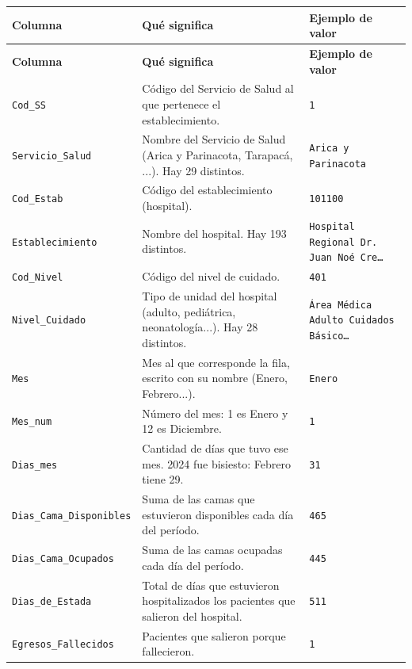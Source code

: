 \documentclass[10.5pt]{article}
\newcommand{\hdr}[1]{\textbf{\color{white}#1}}
\begin{document}
\begin{xltabular}{\linewidth}{@{}p{4.5cm} >{\raggedright\arraybackslash}X p{3.4cm}@{}}
\hdr{Columna} & \hdr{Qué significa} & \hdr{Ejemplo de valor} \\
\endfirsthead
{}\hdr{Columna} & \hdr{Qué significa} & \hdr{Ejemplo de valor} \\
\endhead
\texttt{Cod\_\allowbreak{}SS} & Código del Servicio de Salud al que pertenece el establecimiento. & \texttt{1} \\
\texttt{Servicio\_\allowbreak{}Salud} & Nombre del Servicio de Salud (Arica y Parinacota, Tarapacá, ...). Hay 29 distintos. & \texttt{Arica y Parinacota} \\
\texttt{Cod\_\allowbreak{}Estab} & Código del establecimiento (hospital). & \texttt{101100} \\
\texttt{Establecimiento} & Nombre del hospital. Hay 193 distintos. & \texttt{Hospital Regional Dr. Juan Noé Cre…} \\
\texttt{Cod\_\allowbreak{}Nivel} & Código del nivel de cuidado. & \texttt{401} \\
\texttt{Nivel\_\allowbreak{}Cuidado} & Tipo de unidad del hospital (adulto, pediátrica, neonatología...). Hay 28 distintos. & \texttt{Área Médica Adulto Cuidados Básico…} \\
\texttt{Mes} & Mes al que corresponde la fila, escrito con su nombre (Enero, Febrero...). & \texttt{Enero} \\
\texttt{Mes\_\allowbreak{}num} & Número del mes: 1 es Enero y 12 es Diciembre. & \texttt{1} \\
\texttt{Dias\_\allowbreak{}mes} & Cantidad de días que tuvo ese mes. 2024 fue bisiesto: Febrero tiene 29. & \texttt{31} \\
\texttt{Dias\_\allowbreak{}Cama\_\allowbreak{}Disponibles} & Suma de las camas que estuvieron disponibles cada día del período. & \texttt{465} \\
\texttt{Dias\_\allowbreak{}Cama\_\allowbreak{}Ocupados} & Suma de las camas ocupadas cada día del período. & \texttt{445} \\
\texttt{Dias\_\allowbreak{}de\_\allowbreak{}Estada} & Total de días que estuvieron hospitalizados los pacientes que salieron del hospital. & \texttt{511} \\
\texttt{Egresos\_\allowbreak{}Fallecidos} & Pacientes que salieron porque fallecieron. & \texttt{1} \\

\end{xltabular}
\end{document}
